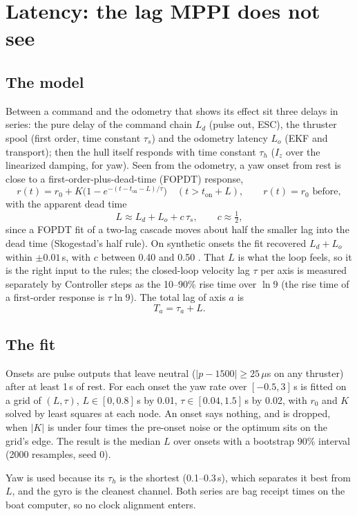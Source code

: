 \section{Latency: the lag MPPI does not see}
\label{sec:latency}

\subsection{The model}
Between a command and the odometry that shows its effect sit three delays in series: the pure
delay of the command chain $L_d$ (pulse out, ESC), the thruster spool (first order, time
constant $\tau_s$) and the odometry latency $L_o$ (EKF and transport); then the hull itself
responds with time constant $\tau_h$ ($I_z$ over the linearized damping, for yaw). Seen from
the odometry, a yaw onset from rest is close to a first-order-plus-dead-time (FOPDT)
response,
\[
  r(t) = r_0 + K\Big(1 - e^{-(t - t_\text{on} - L)/\tau}\Big)\quad (t > t_\text{on} + L),
  \qquad r(t) = r_0 \text{ before},
\]
with the apparent dead time
\[
  L \approx L_d + L_o + c\,\tau_s, \qquad c \approx \tfrac12,
\]
since a FOPDT fit of a two-lag cascade moves about half the smaller lag into the dead time
(Skogestad's half rule). On synthetic onsets the fit recovered $L_d + L_o$ within $\pm0.01$\,s,
with $c$ between 0.40 and 0.50 . That $L$ is what the loop
feels, so it is the right input to the rules; the closed-loop velocity lag $\tau$ per axis is
measured separately by Controller steps as the 10--90\% rise time over $\ln 9$ (the rise time
of a first-order response is $\tau\ln 9$). The total lag of axis $a$ is
\[
  T_a = \tau_a + L .
\]

\subsection{The fit}
Onsets are pulse outputs that leave neutral ($|p - 1500| \ge 25\,\mu$s on any thruster) after at
least 1\,s of rest. For each onset the yaw rate over $[-0.5, 3]$\,s is fitted on a grid of
$(L, \tau)$, $L \in [0, 0.8]$\,s by 0.01, $\tau \in [0.04, 1.5]$\,s by 0.02, with $r_0$ and $K$ solved
by least squares at each node. An onset says nothing, and is dropped, when $|K|$ is under four
times the pre-onset noise or the optimum sits on the grid's edge. The result is the median $L$
over onsets with a bootstrap 90\% interval (2000 resamples, seed 0).

Yaw is used because its $\tau_h$ is the shortest (0.1--0.3\,s), which separates it best from $L$,
and the gyro is the cleanest channel. Both series are bag receipt times on the boat computer,
so no clock alignment enters.

